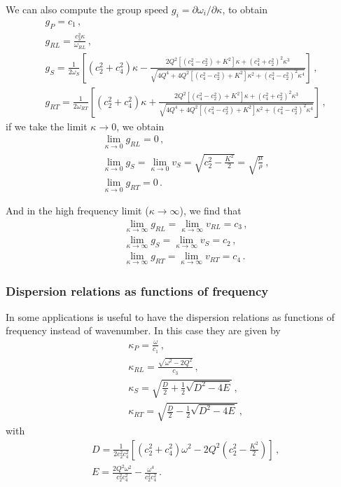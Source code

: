 \documentclass[12pt]{article}
\begin{document}
We can also compute the group speed \(g_i = \partial \omega_i/\partial \kappa\), to obtain
\begin{align}
&g_P = c_1 \, ,\\
&g_{RL} = \frac{c_3^2 \kappa}{\omega_{RL}}\, ,\\
&g_S = \frac{1}{2\omega_S}\left[(c_2^2 + c_4^2)\kappa - \frac{2Q^2[(c_4^2 - c_2^2) + K^2]\kappa + (c_4^2 + c_2^2)^2\kappa^3}{\sqrt{4Q^4 + 4Q^2[(c_4^2 - c_2^2) + K^2]\kappa^2 + (c_4^2 - c_2^2)^2 \kappa^4}}\right] \, ,\\
&g_{RT} = \frac{1}{2\omega_{RT}}\left[(c_2^2 + c_4^2)\kappa + \frac{2Q^2[(c_4^2 - c_2^2) + K^2]\kappa + (c_4^2 + c_2^2)^2\kappa^3}{\sqrt{4Q^4 +  4Q^2[(c_4^2 - c_2^2) + K^2]\kappa^2 + (c_4^2 - c_2^2)^2 \kappa^4}}\right]\, ,
\end{align}
if we take the limit \(\kappa \rightarrow 0\), we obtain
\begin{align*}
&\lim_{\kappa \rightarrow 0}g_{RL} = 0\, ,\\
&\lim_{\kappa \rightarrow 0}g_S = \lim_{\kappa \rightarrow 0} v_S = \sqrt{c_2^2 - \frac{K^2}{2}}=\sqrt{\frac{\mu}{\rho}}\, ,\\
&\lim_{\kappa \rightarrow 0}g_{RT} = 0\, .
\end{align*}

And in the high frequency limit (\(\kappa \rightarrow \infty\)), we find that
\begin{align*}
&\lim_{\kappa \rightarrow \infty}g_{RL} = \lim_{\kappa \rightarrow \infty}v_{RL} = c_3\, ,\\
&\lim_{\kappa \rightarrow \infty}g_S = \lim_{\kappa \rightarrow \infty}v_S = c_2\, ,\\
&\lim_{\kappa \rightarrow \infty}g_{RT} = \lim_{\kappa \rightarrow \infty}v_{RT} = c_4\, .
\end{align*}

\subsubsection{Dispersion relations as functions of frequency}
In some applications is useful to have the dispersion relations as functions of frequency instead of wavenumber. In this case they are given by
\begin{align}
&\kappa_P = \frac{\omega}{c_1}\, ,\\
&\kappa_{RL} = \frac{\sqrt{\omega^2 - 2Q^2}}{c_3}\, ,\\
&\kappa_S = \sqrt{\frac{D}{2} + \frac{1}{2} \sqrt{D^2 - 4E}}\, ,\\
&\kappa_{RT} = \sqrt{\frac{D}{2} - \frac{1}{2} \sqrt{D^2 - 4E}}\, ,
\end{align}
with
\begin{align*}
&D = \frac{1}{2c_2^2 c_4^2}\left[(c_2^2 + c_4^2)\omega^2 - 2Q^2\left(c_2^2 - \frac{K^2}{2}\right)\right]\, ,\\
&E = \frac{2Q^2 \omega^2}{c_2^2 c_4^2} - \frac{\omega^4}{c_2^2 c_4^2}\, .
\end{align*}
\end{document}
